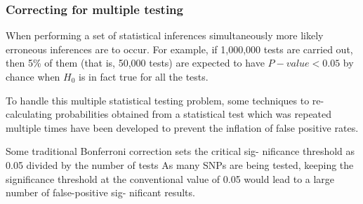 


\subsubsection{Correcting for multiple testing}

When performing  a set of statistical inferences simultaneously more likely erroneous inferences are to occur.
For example, if 1,000,000 tests are carried
out, then 5\% of them (that is, 50,000 tests) are expected to
have $P-value < 0.05$ by chance when $H_0$ is in fact true for all the tests.

To handle this multiple statistical testing problem,
some techniques  to re-calculating probabilities obtained from a statistical test which was repeated multiple times
have been developed to prevent the inflation of false positive rates.



Some traditional Bonferroni correction sets the critical sig-
nificance threshold as 0.05 divided by the number of
tests
As many SNPs are being tested, keeping
the significance threshold at the conventional value of
0.05 would lead to a large number of false-positive sig-
nificant results.



